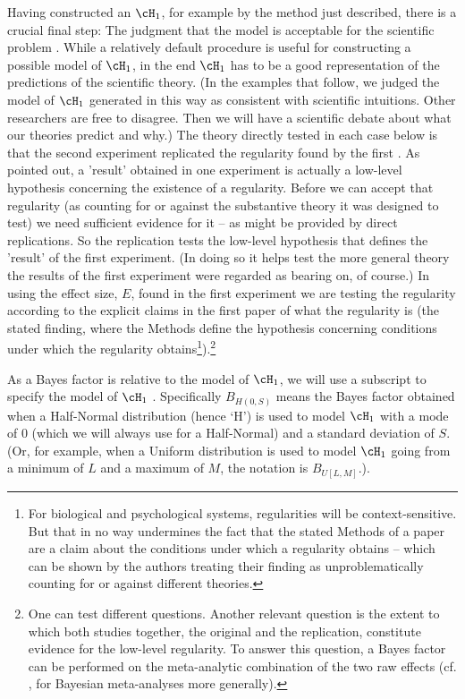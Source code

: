 Having constructed an $\cH_1$, for example by the method just described, there is a crucial final step: The judgment that the model is acceptable for the scientific problem \cite{Good1983,Lindley2004}. While a relatively default procedure is useful for constructing a possible model of $\cH_1$, in the end $\cH_1$ has to be a good representation of the predictions of the scientific theory. (In the examples that follow, we judged the model of $\cH_1$ generated in this way as consistent with scientific intuitions. Other researchers are free to disagree. Then we will have a scientific debate about what our theories predict and why.) The theory directly tested in each case below is that the second experiment replicated the regularity found by the first \cite{Verhagen2014}. As  pointed out, a 'result' obtained in one experiment is actually a low-level hypothesis concerning the existence of a regularity. Before we can accept that regularity (as counting for or against the substantive theory it was designed to test) we need sufficient evidence for it -- as might be provided by direct replications. So the replication tests the low-level hypothesis that defines the 'result' of the first experiment. (In doing so it helps test the more general theory the results of the first experiment were regarded as bearing on, of course.)  In using the effect size, $E$, found in the first experiment we are testing the regularity according to the explicit claims in the first paper of what the regularity is (the stated finding, where the Methods define the hypothesis concerning conditions under which the regularity obtains\footnote{For biological and psychological systems, regularities will be context-sensitive. But that in no way undermines the fact that the stated Methods of a paper are a claim about the conditions under which a regularity obtains -- which can be shown by the authors treating their finding as unproblematically counting for or against different theories.}).\footnote{One can test different questions.  Another relevant question is the extent to which both studies together, the original and the replication, constitute evidence for the low-level regularity. To answer this question, a Bayes factor can be performed on the meta-analytic combination of the two raw effects (cf. , for Bayesian meta-analyses more generally).}

As a Bayes factor is relative to the model of $\cH_1$, we will use a subscript to specify the model of $\cH_1$ \cite<a notational convention used in>{Dienes2014,Dienes2015}. Specifically $B_{H(0, S)}$ means the Bayes factor obtained when a Half-Normal distribution (hence `H') is used to model $\cH_1$ with a mode of 0 (which we will always use for a Half-Normal) and a standard deviation of $S$. (Or, for example, when a Uniform distribution is used to model $\cH_1$ going from a minimum of $L$ and a maximum of $M$, the notation is $B_{U[L, M]}$.).

